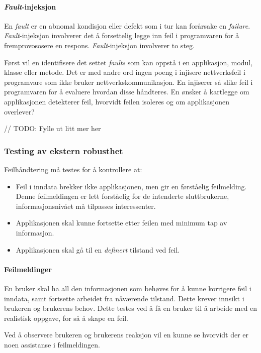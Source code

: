 \paragraph{\emph{Fault}-injeksjon}

En \emph{fault} er en abnomal kondisjon eller defekt som i tur kan
forårsake en \emph{failure}. \emph{Fault}-injeksjon involverer det å
forsettelig legge inn feil i programvaren for å fremprovososere en
respons. \emph{Fault}-injeksjon involverer to steg.

Først vil en identifisere det settet \emph{faults} som kan oppstå i en
applikasjon, modul, klasse eller metode. Det er med andre ord ingen
poeng i injisere nettverksfeil i programvare som ikke bruker
nettverkskommunikasjon. En injiserer så slike feil i programvaren for å
evaluere hvordan disse håndteres. En ønsker å kartlegge om applikasjonen
detekterer feil, hvorvidt feilen isoleres og om applikasjonen overlever?

// TODO: Fylle ut litt mer her

\subsubsection{Testing av ekstern robusthet}

Feilhåndtering må testes for å kontrollere at:

\begin{itemize}
\item
  Feil i inndata brekker ikke applikasjonen, men gir en førståelig
  feilmelding. Denne feilmeldingen er lett forståelig for de intenderte
  sluttbrukerne, informasjonsnivået må tilpasses interessenter.
\item
  Applikasjonen skal kunne fortsette etter feilen med minimum tap av
  informasjon.
\item
  Applikasjonen skal gå til en \emph{definert} tilstand ved feil.
\end{itemize}
\paragraph{Feilmeldinger}

En bruker skal ha all den informasjonen som behøves for å kunne
korrigere feil i inndata, samt fortsette arbeidet fra nåværende
tilstand. Dette krever innsikt i brukeren og brukerens behov. Dette
testes ved å få en bruker til å arbeide med en realistisk oppgave, for
så å skape en feil.

Ved å observere brukeren og brukerens reaksjon vil en kunne se hvorvidt
der er noen assistanse i feilmeldingen.


